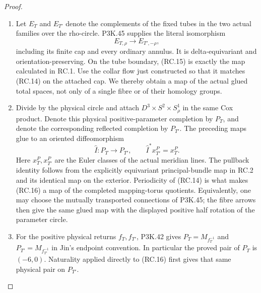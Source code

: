 \begin{proof}
\begin{enumerate}[label=\arabic*.]
\par

\medskip\noindent\textbf{RC.3. The completed quotient and its characteristic numbers}

\par\nobreak

\item Let \(E_T\) and \(E_{T'}\) denote the complements of the fixed tubes
in the two actual families over the rho-circle. P3K.45 supplies the
literal isomorphism
\[
       E_{T,\rho}\longrightarrow E_{T',-\rho},       \tag{RC.15}
\]
including its finite cap and every ordinary annulus. It is
delta-equivariant and orientation-preserving. On the tube boundary,
(RC.15) is exactly the map calculated in RC.1. Use the collar flow
just constructed so that it matches (RC.14) on the attached cap.
We thereby obtain a map of the actual glued total spaces, not only
of a single fibre or of their homology groups.

\item Divide by the physical circle and attach
\(D^3\times S^2\times S^1_\rho\) in the same Cox product. Denote
this physical positive-parameter completion by \(P_T\), and denote
the corresponding reflected completion by \(P_{T'}\). The preceding
maps glue to an oriented diffeomorphism
\[
              \widehat I:P_T\longrightarrow P_{T'},
       \qquad \widehat I^*x^P_{T'}=x^P_T.            \tag{RC.16}
\]
Here \(x^P_T,x^P_{T'}\) are the Euler classes of the actual meridian
lines. The pullback identity follows from the explicitly equivariant
principal-bundle map in RC.2 and its identical map on the exterior.
Periodicity of (RC.14) is what makes (RC.16) a map of the completed
mapping-torus quotients. Equivalently, one may choose the mutually
transported connections of P3K.45; the fibre arrows then give the
same glued map with the displayed positive half rotation of the
parameter circle.

\item For the positive physical returns \(f_T,f_{T'}\), P3K.42 gives
\(P_T=M_{f_T^{-1}}\) and \(P_{T'}=M_{f_{T'}^{-1}}\) in Jin's
endpoint convention. In particular the proved pair of \(P_T\) is
\((-6,0)\). Naturality applied directly to (RC.16) first gives that
same physical pair on \(P_{T'}\).


\end{enumerate}
\end{proof}
